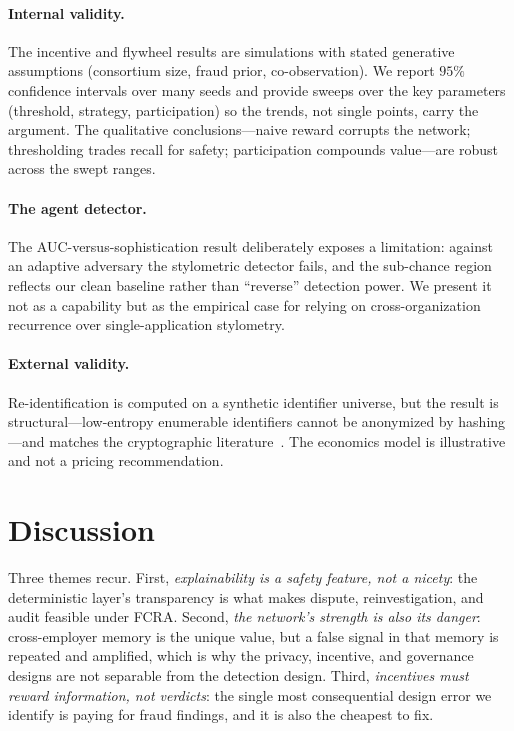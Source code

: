 \documentclass[11pt]{article}
\begin{document}
\paragraph{Internal validity.} The incentive and flywheel results are simulations
with stated generative assumptions (consortium size, fraud prior, co-observation).
We report $95\%$ confidence intervals over many seeds and provide sweeps over the
key parameters (threshold, strategy, participation) so the trends, not single
points, carry the argument. The qualitative conclusions---naive reward corrupts
the network; thresholding trades recall for safety; participation compounds
value---are robust across the swept ranges.

\paragraph{The agent detector.} The AUC-versus-sophistication result deliberately
exposes a limitation: against an adaptive adversary the stylometric detector
fails, and the sub-chance region reflects our clean baseline rather than
``reverse'' detection power. We present it not as a capability but as the empirical
case for relying on cross-organization recurrence over single-application
stylometry.

\paragraph{External validity.} Re-identification is computed on a synthetic
identifier universe, but the result is structural---low-entropy enumerable
identifiers cannot be anonymized by hashing---and matches the cryptographic
literature~\cite{cook2019,otpsi2026}. The economics model is illustrative and not
a pricing recommendation.

\section{Discussion}\label{sec:discuss}
Three themes recur. First, \emph{explainability is a safety feature, not a
nicety}: the deterministic layer's transparency is what makes dispute,
reinvestigation, and audit feasible under FCRA. Second, \emph{the network's
strength is also its danger}: cross-employer memory is the unique value, but a
false signal in that memory is repeated and amplified, which is why the privacy,
incentive, and governance designs are not separable from the detection design.
Third, \emph{incentives must reward information, not verdicts}: the single most
consequential design error we identify is paying for fraud findings, and it is
also the cheapest to fix.
\end{document}
